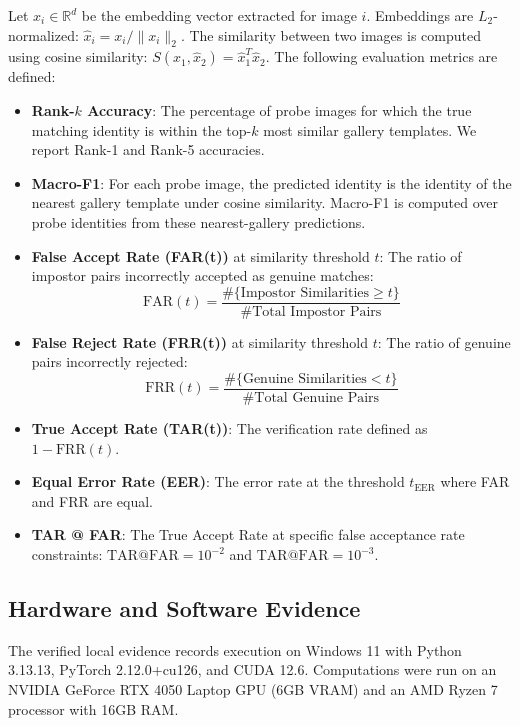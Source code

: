 Let $x_i \in \mathbb{R}^d$ be the embedding vector extracted for image $i$. Embeddings are $L_2$-normalized: $\hat{x}_i = x_i / \lVert x_i \rVert_2$. The similarity between two images is computed using cosine similarity: $S(\hat{x}_1, \hat{x}_2) = \hat{x}_1^T \hat{x}_2$. The following evaluation metrics are defined:
\begin{itemize}
    \item \textbf{Rank-$k$ Accuracy}: The percentage of probe images for which the true matching identity is within the top-$k$ most similar gallery templates. We report Rank-1 and Rank-5 accuracies.
    \item \textbf{Macro-F1}: For each probe image, the predicted identity is the identity of the nearest gallery template under cosine similarity. Macro-F1 is computed over probe identities from these nearest-gallery predictions.
    \item \textbf{False Accept Rate (FAR(t))} at similarity threshold $t$: The ratio of impostor pairs incorrectly accepted as genuine matches:
    \begin{equation}
        \mathrm{FAR}(t) = \frac{\#\{\text{Impostor Similarities} \ge t\}}{\#\text{Total Impostor Pairs}}
    \end{equation}
    \item \textbf{False Reject Rate (FRR(t))} at similarity threshold $t$: The ratio of genuine pairs incorrectly rejected:
    \begin{equation}
        \mathrm{FRR}(t) = \frac{\#\{\text{Genuine Similarities} < t\}}{\#\text{Total Genuine Pairs}}
    \end{equation}
    \item \textbf{True Accept Rate (TAR(t))}: The verification rate defined as $1 - \mathrm{FRR}(t)$.
    \item \textbf{Equal Error Rate (EER)}: The error rate at the threshold $t_{\mathrm{EER}}$ where FAR and FRR are equal.
    \item \textbf{TAR @ FAR}: The True Accept Rate at specific false acceptance rate constraints: $\mathrm{TAR@FAR}=10^{-2}$ and $\mathrm{TAR@FAR}=10^{-3}$.
\end{itemize}

\subsection{Hardware and Software Evidence}

The verified local evidence records execution on Windows 11 with Python 3.13.13, PyTorch 2.12.0+cu126, and CUDA 12.6. Computations were run on an NVIDIA GeForce RTX 4050 Laptop GPU (6GB VRAM) and an AMD Ryzen 7 processor with 16GB RAM.

